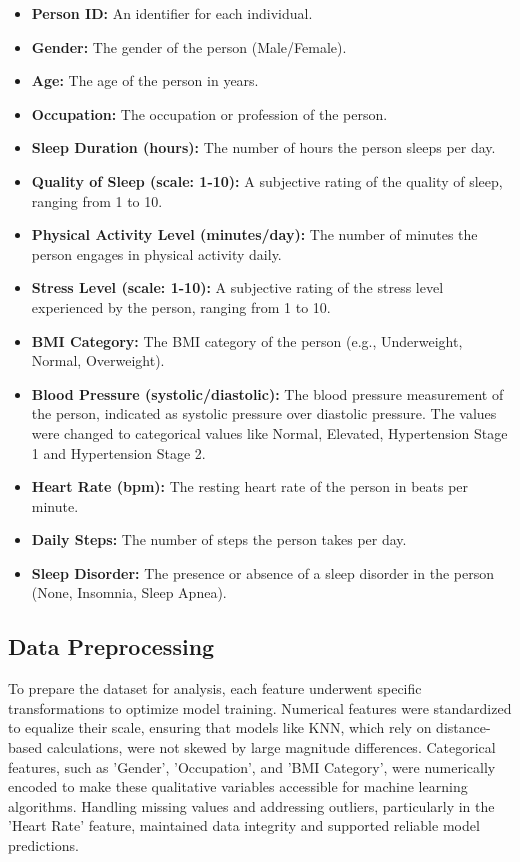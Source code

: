 \documentclass[conference]{IEEEtran}
\begin{document}
    \begin{itemize}
    \item \textbf{Person ID:} An identifier for each individual.
    \item \textbf{Gender:} The gender of the person (Male/Female).
    \item \textbf{Age:} The age of the person in years. 
    \item \textbf{Occupation:} The occupation or profession of the person.
    \item \textbf{Sleep Duration (hours):} The number of hours the person sleeps per day. 
    \item \textbf{Quality of Sleep (scale: 1-10):} A subjective rating of the quality of sleep, ranging from 1 to 10. 
    \item \textbf{Physical Activity Level (minutes/day):}  The number of minutes the person engages in physical activity daily.
    \item \textbf{Stress Level (scale: 1-10):} A subjective rating of the stress level experienced by the person, ranging from 1 to 10.
    \item \textbf{BMI Category:} The BMI category of the person (e.g., Underweight, Normal, Overweight).
    \item \textbf{Blood Pressure (systolic/diastolic):} The blood pressure measurement of the person, indicated as systolic pressure over diastolic pressure. The values were changed to categorical values like Normal, Elevated, Hypertension Stage 1 and Hypertension Stage 2.

    \item \textbf{Heart Rate (bpm):} The resting heart rate of the person in beats per minute.
    \item \textbf{Daily Steps:} The number of steps the person takes per day. 
    \item \textbf{Sleep Disorder:} The presence or absence of a sleep disorder in the person (None, Insomnia, Sleep Apnea). 
    \end{itemize}
    
\subsection{Data Preprocessing}

To prepare the dataset for analysis, each feature underwent specific transformations to optimize model training. Numerical features were standardized to equalize their scale, ensuring that models like KNN, which rely on distance-based calculations, were not skewed by large magnitude differences. Categorical features, such as 'Gender', 'Occupation', and 'BMI Category', were numerically encoded to make these qualitative variables accessible for machine learning algorithms. Handling missing values and addressing outliers, particularly in the 'Heart Rate' feature, maintained data integrity and supported reliable model predictions.
\end{document}
